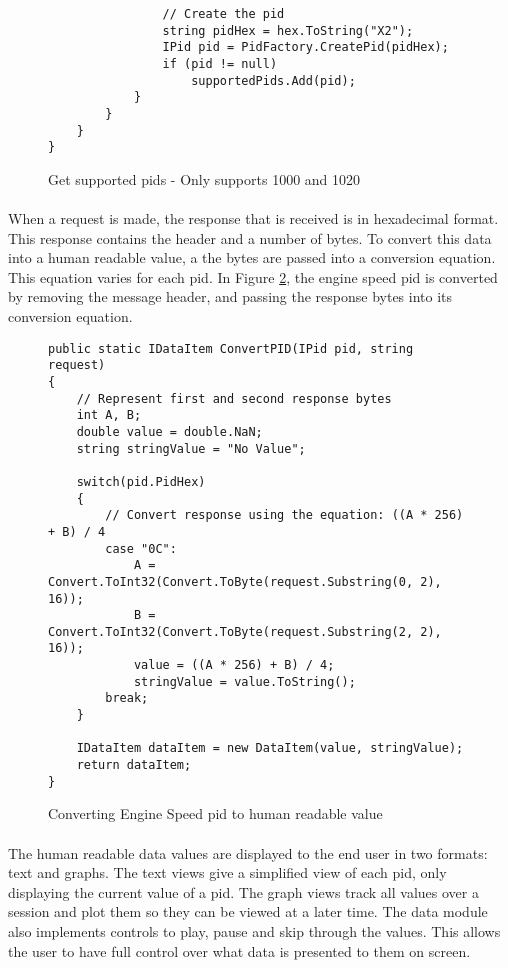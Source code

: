 {\begin{figure}[h]
\begin{lstlisting}
				// Create the pid
				string pidHex = hex.ToString("X2");
				IPid pid = PidFactory.CreatePid(pidHex);
				if (pid != null)
					supportedPids.Add(pid);
			}
		}
	}
}
			\end{lstlisting}
			\caption{Get supported pids - Only supports 1000 and 1020}
			\label{code:SupportedPids}
		\end{figure}
		
		\paragraph{}{
		When a request is made, the response that is received is in hexadecimal format. This response contains the header and a number of bytes. To convert this data into a human readable value, a the bytes are passed into a conversion equation. This equation varies for each pid. In Figure \ref{code:ConvertingPids}, the engine speed pid is converted by removing the message header, and passing the response bytes into its conversion equation.
		}
		
		\begin{figure}[h]
			\begin{lstlisting}
public static IDataItem ConvertPID(IPid pid, string request)
{
	// Represent first and second response bytes
	int A, B;
	double value = double.NaN;
	string stringValue = "No Value";
	
	switch(pid.PidHex)
	{
		// Convert response using the equation: ((A * 256) + B) / 4
		case "0C":    
			A = Convert.ToInt32(Convert.ToByte(request.Substring(0, 2), 16));
			B = Convert.ToInt32(Convert.ToByte(request.Substring(2, 2), 16));
			value = ((A * 256) + B) / 4;
			stringValue = value.ToString();
		break;
	}

	IDataItem dataItem = new DataItem(value, stringValue);	
    return dataItem;
}
			\end{lstlisting}
			\caption{Converting Engine Speed pid to human readable value}
			\label{code:ConvertingPids}
		\end{figure}		
			
		\paragraph{}{
		The human readable data values are displayed to the end user in two formats: text and graphs. The text views give a simplified view of each pid, only displaying the current value of a pid. The graph views track all values over a session and plot them so they can be viewed at a later time. The data module also implements controls to play, pause and skip through the values. This allows the user to have full control over what data is presented to them on screen. 
		}
		
}
